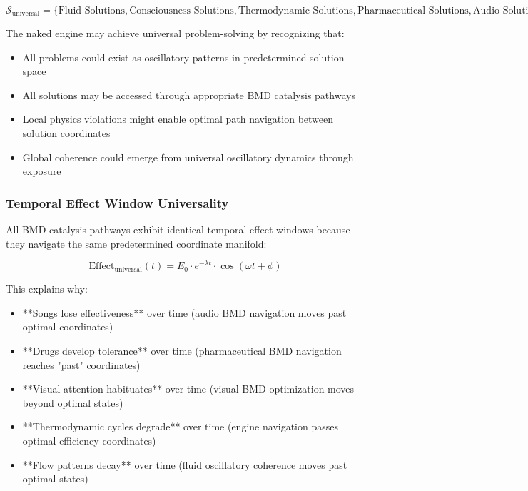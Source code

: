 \documentclass[11pt,a4paper]{article}
\theoremstyle{remark}
\begin{document}
\begin{equation}
\mathcal{S}_{\text{universal}} = \{\text{Fluid Solutions}, \text{Consciousness Solutions}, \text{Thermodynamic Solutions}, \text{Pharmaceutical Solutions}, \text{Audio Solutions}, \text{Visual Solutions}\}
\end{equation}

The naked engine may achieve universal problem-solving by recognizing that:
\begin{itemize}
\item All problems could exist as oscillatory patterns in predetermined solution space
\item All solutions may be accessed through appropriate BMD catalysis pathways
\item Local physics violations might enable optimal path navigation between solution coordinates
\item Global coherence could emerge from universal oscillatory dynamics through exposure
\end{itemize}

\subsubsection{Temporal Effect Window Universality}

All BMD catalysis pathways exhibit identical temporal effect windows because they navigate the same predetermined coordinate manifold:

\begin{equation}
\text{Effect}_{\text{universal}}(t) = E_0 \cdot e^{-\lambda t} \cdot \cos(\omega t + \phi)
\end{equation}

This explains why:
\begin{itemize}
\item **Songs lose effectiveness** over time (audio BMD navigation moves past optimal coordinates)
\item **Drugs develop tolerance** over time (pharmaceutical BMD navigation reaches "past" coordinates)  
\item **Visual attention habituates** over time (visual BMD optimization moves beyond optimal states)
\item **Thermodynamic cycles degrade** over time (engine navigation passes optimal efficiency coordinates)
\item **Flow patterns decay** over time (fluid oscillatory coherence moves past optimal states)
\end{itemize}
\end{document}

